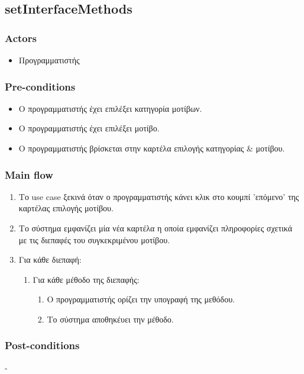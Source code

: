 \documentclass[../diploma_thesis.tex]{subfiles}
\begin{document}
\subsection{setInterfaceMethods}
\subsubsection{Actors}
\begin{itemize}
\item  Προγραμματιστής
\end{itemize}
\subsubsection{Pre-conditions}
\begin{itemize}
\item Ο προγραμματιστής έχει επιλέξει κατηγορία μοτίβων.
\item  Ο προγραμματιστής έχει επιλέξει μοτίβο.
\item Ο προγραμματιστής βρίσκεται στην καρτέλα επιλογής κατηγορίας \& μοτίβου.
\end{itemize}
\subsubsection{Main flow}
\begin{enumerate}
\item Το use case ξεκινά όταν ο προγραμματιστής κάνει κλικ στο κουμπί 'επόμενο' της καρτέλας επιλογής μοτίβου.
\item Το σύστημα εμφανίζει μία νέα καρτέλα η οποία εμφανίζει πληροφορίες σχετικά με τις διεπαφές του συγκεκριμένου μοτίβου.
\item Για κάθε διεπαφή:\begin{enumerate}
\item Για κάθε μέθοδο της διεπαφής:\begin{enumerate}
\item Ο προγραμματιστής ορίζει την υπογραφή της μεθόδου.
\item Το σύστημα αποθηκέυει την μέθοδο.
\end{enumerate}
\end{enumerate}
\end{enumerate}
\subsubsection{Post-conditions}
-
\end{document}
